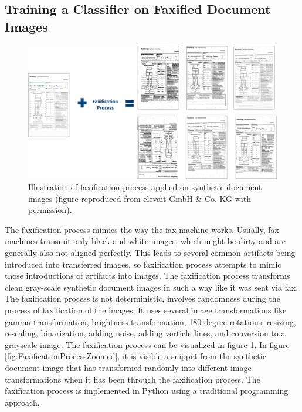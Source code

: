 \subsection{Training a Classifier on Faxified Document Images}\label{trainingfaxifiedclassifier}


\begin{figure}[H]
        \begin{center}
	    \includegraphics[scale=0.25]{images/Evaluation/FaxificationProcess.jpg}
	    \caption[Illustration of faxification process applied on synthetic document images.]{Illustration of faxification process applied on synthetic document images (figure reproduced from elevait GmbH \& Co. KG with permission).}
	    \label{fig:FaxificationProcess}
	    \end{center}
\end{figure}

The faxification process mimics the way the fax machine works. Usually, fax machines transmit only black-and-white images, which might be dirty and are generally also not aligned perfectly. This leads to several common artifacts being introduced into transferred images, so faxification process attempts to mimic those introductions of artifacts into images. The faxification process transforms clean gray-scale synthetic document images in such a way like it was sent via fax. The faxification process is not deterministic, involves randomness during the process of faxification of the images. It uses several image transformations like gamma transformation, brightness transformation, 180-degree rotations, resizing, rescaling, binarization, adding noise, adding verticle lines, and conversion to a grayscale image. The faxification process can be visualized in figure \ref{fig:FaxificationProcess}. In figure \ref{fig:FaxificationProcessZoomed}, it is visible a snippet from the synthetic document image that has transformed randomly into different image transformations when it has been through the faxification process. The faxification process is implemented in Python using a traditional programming approach.



